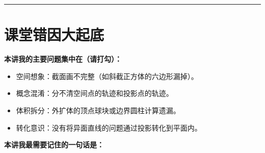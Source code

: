 \documentclass[11pt,a4paper]{ctexart}
\begin{document}

\vspace{1em}
\hrule
\vspace{1em}

{\small \qSolidSquareDoubleFoldPropStem}

\begin{center}
  \qSolidSquareDoubleFoldPropFigure[0.8]
\end{center}
\vspace{0.5em}


\newpage

\section{课堂错因大起底}

\vspace{0.5em}
\noindent\textbf{本讲我的主要问题集中在（请打勾）：}
\begin{itemize}[itemsep=0.4em]
  \item \checkbox 空间想象：截面画不完整（如斜截正方体的六边形漏掉）。
  \item \checkbox 概念混淆：分不清空间点的轨迹和投影点的轨迹。
  \item \checkbox 体积拆分：外扩体的顶点球块或边界圆柱计算遗漏。
  \item \checkbox 转化意识：没有将异面直线的问题通过投影转化到平面内。
\end{itemize}

\vspace{1em}
\noindent\textbf{本讲我最需要记住的一句话是：}
\vspace{0.5em}

\blank{14cm}
\end{document}

